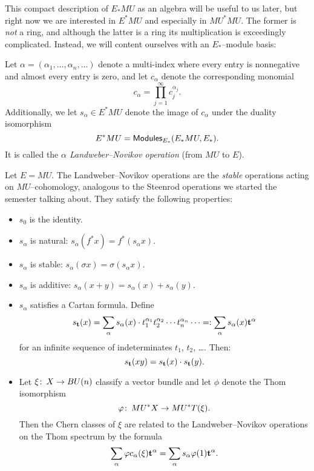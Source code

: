 
\noindent This compact description of $E_* MU$ as an algebra will be useful to us later, but right now we are interested in $E^* MU$ and especially in $MU^* MU$.  The former is \emph{not} a ring, and although the latter is a ring its multiplication is exceedingly complicated.  Instead, we will content ourselves with an $E_*$--module basis:
\begin{definition}
Let $\alpha = (\alpha_1, \ldots, \alpha_n, \ldots)$ denote a multi-index where every entry is nonnegative and almost every entry is zero, and let $c_\alpha$ denote the corresponding monomial \[c_\alpha = \prod_{j=1}^\infty c_j^{\alpha_j}.\]  Additionally, we let $s_\alpha \in E^* MU$ denote the image of $c_\alpha$ under the duality isomorphism \[E^* MU = \mathsf{Modules}_{E_*}(E_* MU, E_*).\]  It is called the \textit{$\alpha${\th} Landweber--Novikov operation} (from $MU$ to $E$).
\end{definition}

\begin{remark}
Let $E = MU$.  The Landweber--Novikov operations are the \emph{stable} operations acting on $MU$--cohomology, analogous to the Steenrod operations we started the semester talking about.  They satisfy the following properties:
\begin{itemize}
\item $s_0$ is the identity.
\item $s_\alpha$ is natural: $s_\alpha(f^* x) = f^*(s_\alpha x)$.
\item $s_\alpha$ is stable: $s_\alpha(\sigma x) = \sigma(s_\alpha x)$.
\item $s_\alpha$ is additive: $s_\alpha(x + y) = s_\alpha(x) + s_\alpha(y)$.
\item $s_\alpha$ satisfies a Cartan formula.  Define \[s_{\mathbf t}(x) = \sum_\alpha s_\alpha(x) \cdot t_1^{\alpha_1} t_2^{\alpha_2} \cdots t_n^{\alpha_n} \cdots =: \sum_{\alpha} s_\alpha(x) \mathbf t^\alpha\] for an infinite sequence of indeterminates $t_1$, $t_2$, \ldots.  Then: \[s_{\mathbf t}(x y) = s_{\mathbf t}(x) \cdot s_{\mathbf t}(y).\]
\item Let $\xi\colon\thinspace X \to BU(n)$ classify a vector bundle and let $\phi$ denote the Thom isomorphism \[\varphi\colon\thinspace MU^* X \to MU^* T(\xi).\]  Then the Chern classes of $\xi$ are related to the Landweber--Novikov operations on the Thom spectrum by the formula \[\sum_\alpha \varphi c_\alpha(\xi) \mathbf t^\alpha = \sum_\alpha s_\alpha \varphi(1) \mathbf t^\alpha.\]
\end{itemize}
\end{remark}

